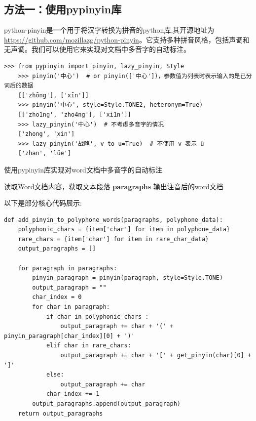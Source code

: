 \documentclass[12pt,hyperref,a4paper,UTF8]{ctexart}
\begin{document}
\subsection{方法一：使用pypinyin库}
python-pinyin是一个用于将汉字转换为拼音的python库,其开源地址为\url{https://github.com/mozillazg/python-pinyin}。它支持多种拼音风格，包括声调和无声调。我们可以使用它来实现对文档中多音字的自动标注。
\begin{lstlisting}[caption={pypinyin库的基础用法}, label={lst1}]
    >>> from pypinyin import pinyin, lazy_pinyin, Style
    >>> pinyin('中心')  # or pinyin(['中心'])，参数值为列表时表示输入的是已分词后的数据
    [['zhōng'], ['xīn']]
    >>> pinyin('中心', style=Style.TONE2, heteronym=True)
    [['zho1ng', 'zho4ng'], ['xi1n']]
    >>> lazy_pinyin('中心')  # 不考虑多音字的情况
    ['zhong', 'xin']
    >>> lazy_pinyin('战略', v_to_u=True)  # 不使用 v 表示 ü
    ['zhan', 'lüe']
\end{lstlisting}
\begin{algorithm}[H]
    \caption{使用pypinyin库实现对word文档中多音字的自动标注}
    
    
    
    \BlankLine
    读取Word文档内容，获取文本段落 \textbf{paragraphs}\;
    输出注音后的word文档\;
\end{algorithm}
\vspace{\baselineskip}
以下是部分核心代码展示:
\begin{lstlisting}[caption={pypinyin库的基础用法}, label={lst2}]
    def add_pinyin_to_polyphone_words(paragraphs, polyphone_data):
    polyphonic_chars = {item['char'] for item in polyphone_data}
    rare_chars = {item['char'] for item in rare_char_data}
    output_paragraphs = []

    for paragraph in paragraphs:
        pinyin_paragraph = pinyin(paragraph, style=Style.TONE)
        output_paragraph = ""
        char_index = 0
        for char in paragraph:
            if char in polyphonic_chars :
                output_paragraph += char + '(' + pinyin_paragraph[char_index][0] + ')'
            elif char in rare_chars:
                output_paragraph += char + '[' + get_pinyin(char)[0] + ']'
            else:
                output_paragraph += char
            char_index += 1
        output_paragraphs.append(output_paragraph)
    return output_paragraphs
\end{lstlisting}
\end{document}
